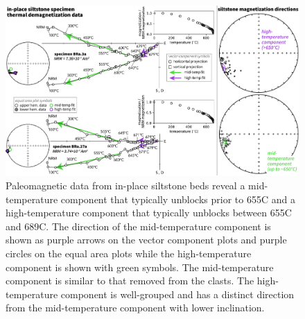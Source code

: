 \documentclass[draft]{agujournal2018}
\begin{document}
\begin{figure}[!ht]
\noindent\includegraphics[width=\textwidth]{figures/BRa_pmag.pdf}
\caption{\small{Paleomagnetic data from in-place siltstone beds reveal a mid-temperature component that typically unblocks prior to 655\textdegree C and a high-temperature component that typically unblocks between 655\textdegree C and 689\textdegree C. The direction of the mid-temperature component is shown as purple arrows on the vector component plots and purple circles on the equal area plots while the high-temperature component is shown with green symbols. The mid-temperature component is similar to that removed from the clasts. The high-temperature component is well-grouped and has a distinct direction from the mid-temperature component with lower inclination.}}
\label{fig:insitu_pmag}
\end{figure}
\end{document}

